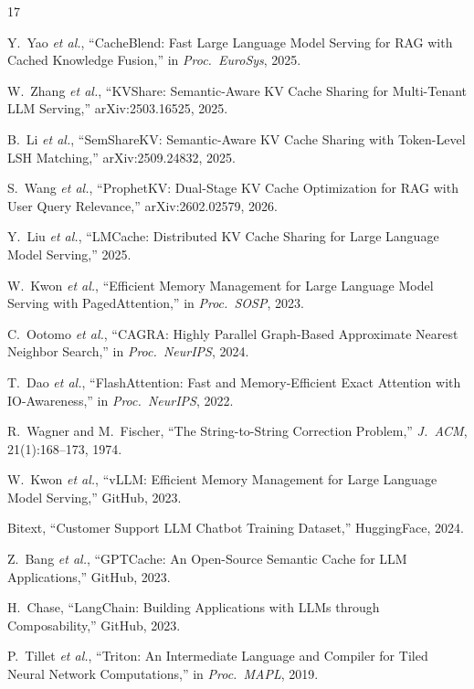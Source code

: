 \documentclass[11pt,twocolumn]{article}
\begin{document}
\begin{thebibliography}{17}

Y.~Yao \textit{et al.},
``CacheBlend: Fast Large Language Model Serving for RAG with Cached
Knowledge Fusion,''
in \textit{Proc.\ EuroSys}, 2025.

W.~Zhang \textit{et al.},
``KVShare: Semantic-Aware KV Cache Sharing for Multi-Tenant LLM
Serving,''
arXiv:2503.16525, 2025.

B.~Li \textit{et al.},
``SemShareKV: Semantic-Aware KV Cache Sharing with Token-Level LSH
Matching,''
arXiv:2509.24832, 2025.

S.~Wang \textit{et al.},
``ProphetKV: Dual-Stage KV Cache Optimization for RAG with User Query
Relevance,''
arXiv:2602.02579, 2026.

Y.~Liu \textit{et al.},
``LMCache: Distributed KV Cache Sharing for Large Language Model
Serving,''
2025.

W.~Kwon \textit{et al.},
``Efficient Memory Management for Large Language Model Serving with
PagedAttention,''
in \textit{Proc.\ SOSP}, 2023.

C.~Ootomo \textit{et al.},
``CAGRA: Highly Parallel Graph-Based Approximate Nearest Neighbor
Search,''
in \textit{Proc.\ NeurIPS}, 2024.

T.~Dao \textit{et al.},
``FlashAttention: Fast and Memory-Efficient Exact Attention with
IO-Awareness,''
in \textit{Proc.\ NeurIPS}, 2022.

R.~Wagner and M.~Fischer,
``The String-to-String Correction Problem,''
\textit{J.\ ACM}, 21(1):168--173, 1974.

W.~Kwon \textit{et al.},
``vLLM: Efficient Memory Management for Large Language Model Serving,''
GitHub, 2023.

Bitext,
``Customer Support LLM Chatbot Training Dataset,''
HuggingFace, 2024.

Z.~Bang \textit{et al.},
``GPTCache: An Open-Source Semantic Cache for LLM Applications,''
GitHub, 2023.

H.~Chase,
``LangChain: Building Applications with LLMs through Composability,''
GitHub, 2023.

P.~Tillet \textit{et al.},
``Triton: An Intermediate Language and Compiler for Tiled Neural
Network Computations,''
in \textit{Proc.\ MAPL}, 2019.

\end{thebibliography}
\end{document}
